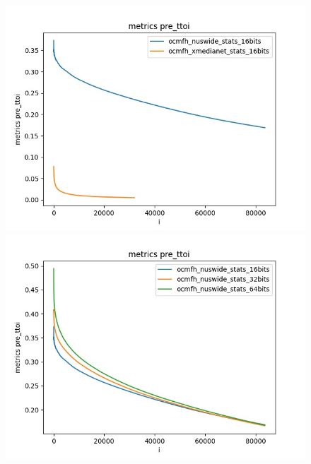 \begin{figure}[H]
\begin{minipage}[!h]{0.6\linewidth}
            \end{minipage}
            \begin{minipage}[!h]{0.6\linewidth}
                \centering
                \includegraphics[width=\linewidth]{resultsImages/precision/metrics pre_ttoi_ocmfh_both.jpeg}
            \end{minipage}
            \begin{minipage}[!h]{0.6\linewidth}
                \centering
                \includegraphics[width=\linewidth]{resultsImages/precision/metrics pre_ttoi_ocmfh_nuswide.jpeg}

\end{minipage}
\end{figure}
